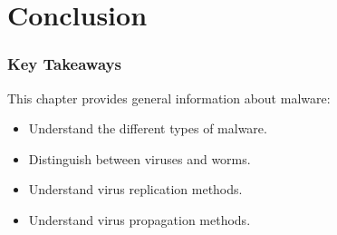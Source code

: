 \documentclass{beamer}
\begin{document}



\section{Conclusion}

\begin{frame}
  \frametitle{Key Takeaways}
  This chapter provides general information about malware:
  \begin{itemize}
  \item Understand the different types of malware.
  \item Distinguish between viruses and worms.
  \item Understand virus replication methods.
    \item Understand virus propagation methods.
    \end{itemize}
\end{frame}
\end{document}
